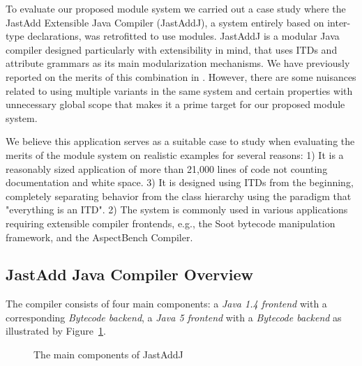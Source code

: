 To evaluate our proposed module system we carried out a case study where
the JastAdd Extensible Java Compiler (JastAddJ), a system entirely based on
inter-type declarations, was retrofitted to use modules. JastAddJ is a
modular Java compiler designed particularly with extensibility in mind,
that uses ITDs and attribute grammars as its main modularization
mechanisms.  We have previously reported on the merits of this combination
in \cite{aosd08abc}. However, there are some nuisances related to using
multiple variants in the same system and certain properties with
unnecessary global scope that makes it a prime target for our proposed
module system. 

We believe this application serves as a suitable case to study when
evaluating the merits of the module system on realistic examples for
several reasons: 1) It is a reasonably sized application of more than
21,000 lines of code not counting documentation and white space.  3) It is
designed using ITDs from the beginning, completely separating behavior
from the class hierarchy using the paradigm that "everything is an ITD". 2)
The system is commonly used in various applications requiring extensible
compiler frontends, e.g., the Soot bytecode manipulation framework, and the
AspectBench Compiler.

\subsection{JastAdd Java Compiler Overview}
\label{jastaddjoverview}
The compiler consists of four main components: a \emph{Java 1.4 frontend}
with a corresponding \emph{Bytecode backend}, a \emph{Java 5 frontend} with
a \emph{Bytecode backend} as illustrated by Figure~\ref{MainComponents}. 

\begin{figure}[htb!]
  \begin{center}
    \caption{The main components of JastAddJ}
    \label{MainComponents}
  \end{center}
\end{figure}

